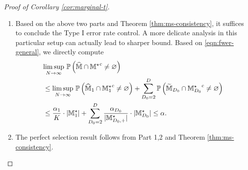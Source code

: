 \documentclass[12pt]{article}
\begin{document}
{\begin{proof}[Proof of Corollary \ref{cor:marginal-t}]
\begin{enumerate}
\begin{align*}
    \end{align*}
    For simplicity, let
    \begin{align*}
        Z_d^\star = \Phi^{-1}\lt(1-\frac{\alpha_d}{2|\bbM^{\star }_{d,+}|} \rt). 
    \end{align*}
    Then
    \begin{align}
        &\underset{N\to\infty}{\lim\sup}~\bbP\lt\{\tilde{\bbM}^c_{d}\cap\bbM^{\star }_k\neq \varnothing\rt\} \notag\\
        &\le \underset{N\to\infty}{\lim\sup}~ \sum_{\cK\in\bbM^{\star }_{d}} \lt(\bbP\lt\{-Z_d^\star - \frac{\tau_\cK}{\sigma_\cK}\le\frac{\htau_{\cK}}{ {\sigma}_\cK} - \frac{\tau_\cK}{\sigma_\cK}\le Z_d^\star - \frac{\tau_\cK}{\sigma_\cK}\rt\} + \frac{\tilde{C}}{(QN_0)^{1/3}}\rt)\notag\\
        & = \underset{N\to\infty}{\lim\sup}~\sum_{\cK\in\bbM_d^\star} \Phi\lt\{r_\cK^{-1}\lt(Z_d^\star - \frac{\tau_\cK}{\sigma_\cK}\rt)\rt\} - \Phi\lt\{r_\cK^{-1}\lt(-Z_d^\star - \frac{\tau_\cK}{\sigma_\cK}\rt)\rt\}.\label{eqn:typeII-limit}
    \end{align}
    
     With Condition \ref{cond:order}, we have
    \begin{align*}
        Z_d^\star =  \Theta\lt(\sqrt{2\ln\frac{2|\bbM_{d,+}^\star|}{\alpha_d}}\rt) =  \Theta(\max\{\sqrt{\delta'\ln N},\sqrt{\ln(2|\bbM^\star_{d,+}|)}\}),~ \lt|\frac{\tau_\cK}{\sigma_\cK}\rt| =  \Theta(N^{1/2+\delta}).
    \end{align*}
    Since $\delta>-1/2$ and $\delta'\ge 0$, we have $|\frac{\tau_\cK}{\sigma_\cK}| \to \infty$ and $Z_d^\star/(|\frac{\tau_\cK}{\sigma_\cK}|) \to 0$. Hence the above limit \eqref{eqn:typeII-limit} converges to zero. This concludes the proof.
    
    \item Based on the above two parts and Theorem \ref{thm:ms-consistency}, it suffices to conclude the Type I error rate control. A more delicate analysis in this particular setup can actually lead to sharper bound. Based on \eqref{eqn:fwer-general}, we directly compute
    \begin{align*}
    &\underset{N \to\infty}{\lim\sup}~{\mathbb{P}}\left(\widehat{{\mathbb{M}}}\cap{{\mathbb{M}}^\star}^c\neq \varnothing\right) \\
    &\le\underset{N \to\infty}{\lim\sup}~{\mathbb{P}}\left(\widehat{{\mathbb{M}}}_1\cap{{\mathbb{M}}_1^\star}^c\neq\varnothing\right) + \sum_{D_0=2}^D {\mathbb{P}}\left(  \widetilde{{\mathbb{M}}}_{D_0}\cap{{\mathbb{M}}_{D_0}^\star}^c\neq\varnothing\right)\\
    &\le 
    \frac{\alpha_1}{K}\cdot|{\mathbb{M}}_1^\star| + \sum_{D_0=2}^D \frac{\alpha_{D_0}}{|{\mathbb{M}}^\star_{D_0,+}|}\cdot|{\mathbb{M}}^\star_{D_0}| \le \alpha. 
    \end{align*}
    
    \item The perfect selection result follows from Part 1,2 and Theorem \ref{thm:ms-consistency}.

\end{enumerate}
 
\end{proof}
}
\end{document}
